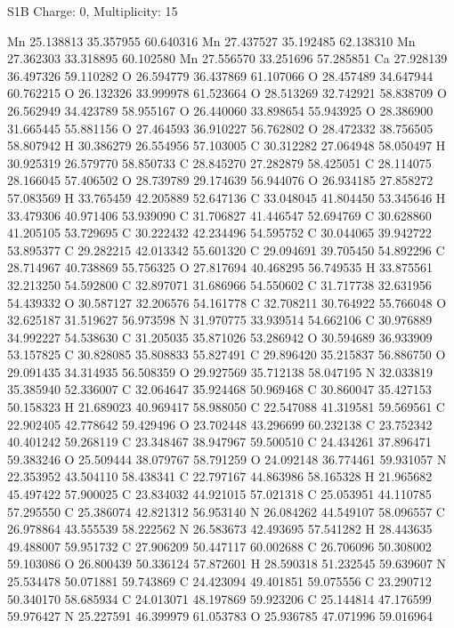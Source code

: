 \documentclass{article}
\begin{document}
S1B   Charge: 0, Multiplicity: 15    
   
Mn 25.138813 35.357955 60.640316
Mn 27.437527 35.192485 62.138310
Mn 27.362303 33.318895 60.102580
Mn 27.556570 33.251696 57.285851
Ca 27.928139 36.497326 59.110282
O 26.594779 36.437869 61.107066
O 28.457489 34.647944 60.762215
O 26.132326 33.999978 61.523664
O 28.513269 32.742921 58.838709
O 26.562949 34.423789 58.955167
O 26.440060 33.898654 55.943925
O 28.386900 31.665445 55.881156
O 27.464593 36.910227 56.762802
O 28.472332 38.756505 58.807942
H 30.386279 26.554956 57.103005
C 30.312282 27.064948 58.050497
H 30.925319 26.579770 58.850733
C 28.845270 27.282879 58.425051
C 28.114075 28.166045 57.406502
O 28.739789 29.174639 56.944076
O 26.934185 27.858272 57.083569
H 33.765459 42.205889 52.647136
C 33.048045 41.804450 53.345646
H 33.479306 40.971406 53.939090
C 31.706827 41.446547 52.694769
C 30.628860 41.205105 53.729695
C 30.222432 42.234496 54.595752
C 30.044065 39.942722 53.895377
C 29.282215 42.013342 55.601320
C 29.094691 39.705450 54.892296
C 28.714967 40.738869 55.756325
O 27.817694 40.468295 56.749535
H 33.875561 32.213250 54.592800
C 32.897071 31.686966 54.550602
C 31.717738 32.631956 54.439332
O 30.587127 32.206576 54.161778
C 32.708211 30.764922 55.766048
O 32.625187 31.519627 56.973598
N 31.970775 33.939514 54.662106
C 30.976889 34.992227 54.538630
C 31.205035 35.871026 53.286942
O 30.594689 36.933909 53.157825
C 30.828085 35.808833 55.827491
C 29.896420 35.215837 56.886750
O 29.091435 34.314935 56.508359
O 29.927569 35.712138 58.047195
N 32.033819 35.385940 52.336007
C 32.064647 35.924468 50.969468
C 30.860047 35.427153 50.158323
H 21.689023 40.969417 58.988050
C 22.547088 41.319581 59.569561
C 22.902405 42.778642 59.429496
O 23.702448 43.296699 60.232138
C 23.752342 40.401242 59.268119
C 23.348467 38.947967 59.500510
C 24.434261 37.896471 59.383246
O 25.509444 38.079767 58.791259
O 24.092148 36.774461 59.931057
N 22.353952 43.504110 58.438341
C 22.797167 44.863986 58.165328
H 21.965682 45.497422 57.900025
C 23.834032 44.921015 57.021318
C 25.053951 44.110785 57.295550
C 25.386074 42.821312 56.953140
N 26.084262 44.549107 58.096557
C 26.978864 43.555539 58.222562
N 26.583673 42.493695 57.541282
H 28.443635 49.488007 59.951732
C 27.906209 50.447117 60.002688
C 26.706096 50.308002 59.103086
O 26.800439 50.336124 57.872601
H 28.590318 51.232545 59.639607
N 25.534478 50.071881 59.743869
C 24.423094 49.401851 59.075556
C 23.290712 50.340170 58.685934
C 24.013071 48.197869 59.923206
C 25.144814 47.176599 59.976427
N 25.227591 46.399979 61.053783
O 25.936785 47.071996 59.016964
\end{document}
